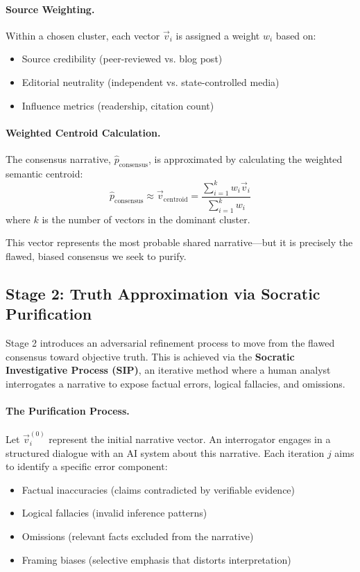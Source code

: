 \documentclass[11pt,a4paper]{article}
\begin{document}
\paragraph{Source Weighting.} Within a chosen cluster, each vector $\vec{v}_i$ is assigned a weight $w_i$ based on:
\begin{itemize}
    \item Source credibility (peer-reviewed vs. blog post)
    \item Editorial neutrality (independent vs. state-controlled media)
    \item Influence metrics (readership, citation count)
\end{itemize}

\paragraph{Weighted Centroid Calculation.} The consensus narrative, $\hat{p}_{\text{consensus}}$, is approximated by calculating the weighted semantic centroid:
\begin{equation}
\hat{p}_{\text{consensus}} \approx \vec{v}_{\text{centroid}} = \frac{\sum_{i=1}^{k} w_i \vec{v}_i}{\sum_{i=1}^{k} w_i}
\end{equation}
where $k$ is the number of vectors in the dominant cluster.

This vector represents the most probable shared narrative---but it is precisely the flawed, biased consensus we seek to purify.

\subsection{Stage 2: Truth Approximation via Socratic Purification}

Stage 2 introduces an adversarial refinement process to move from the flawed consensus toward objective truth. This is achieved via the \textbf{Socratic Investigative Process (SIP)}, an iterative method where a human analyst interrogates a narrative to expose factual errors, logical fallacies, and omissions.

\paragraph{The Purification Process.} Let $\vec{v}_i^{(0)}$ represent the initial narrative vector. An interrogator engages in a structured dialogue with an AI system about this narrative. Each iteration $j$ aims to identify a specific error component:
\begin{itemize}
    \item Factual inaccuracies (claims contradicted by verifiable evidence)
    \item Logical fallacies (invalid inference patterns)
    \item Omissions (relevant facts excluded from the narrative)
    \item Framing biases (selective emphasis that distorts interpretation)
\end{itemize}
\end{document}
